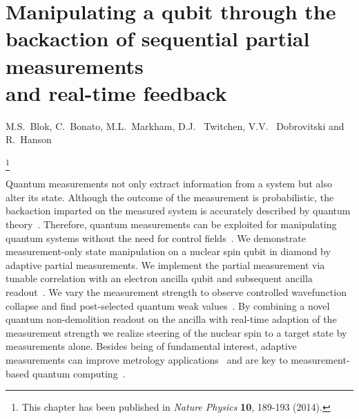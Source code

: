 \graphicspath{{./ch_adptv_msmnt_cntrl/figures/}}


\chapter{Manipulating a qubit through the backaction of sequential partial measurements \\ and real-time feedback }
\label{ch:AMC}

\begin{center} 
    \vspace{-1cm} {M.S.~Blok, C.~Bonato, M.L.~Markham, D.J. ~Twitchen, V.V. ~Dobrovitski and R.~Hanson} 
\end{center}


{\renewcommand{\thefootnote}{}\footnote{This chapter has been published in
    {\em Nature Physics} \textbf{10}, 189-193 (2014).}}


\vspace{-0.5cm} 
Quantum measurements not only extract information from a system but also alter its state. Although the outcome of the measurement is probabilistic, the backaction imparted on the measured system is accurately described by quantum theory~\cite{Guerlin_Nature_2007,Hatridge_Science_2013,Murch_Nature_2013}. Therefore, quantum measurements can be exploited for manipulating quantum systems without the need for control fields~\cite{Ashhab_PhysRevA_2010,Wiseman_NatureNV_2011}. We demonstrate measurement-only state manipulation on a nuclear spin qubit in diamond by adaptive partial measurements. We implement the partial measurement via tunable correlation with an electron ancilla qubit and subsequent ancilla readout~\cite{Brun_PhysRevA_2008,Groen_PRL_2013}. We vary the measurement strength to observe controlled wavefunction collapse and find post-selected quantum weak values~\cite{Brun_PhysRevA_2008,Groen_PRL_2013,Aharonov_PRL_1988,Pryde_PRL_2005,Dressel_ArXiv_2013}. By combining a novel quantum non-demolition readout on the ancilla with real-time adaption of the measurement strength we realize steering of the nuclear spin to a target state by measurements alone. Besides being of fundamental interest, adaptive measurements can improve metrology applications~\cite{Cappellaro_PhysRevA_2012,Higgins_Nature_2007} and are key to measurement-based quantum computing~\cite{Raussendorf_PRL_2001,Prevedel_Nature_2007}.


\clearpage

